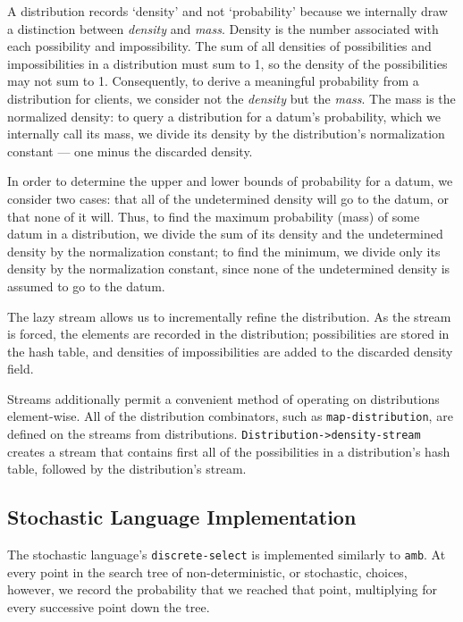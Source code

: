 \documentclass[12pt]{article}
\newcommand{\code}[1]{\texttt{#1}}
\newcommand{\concept}[1]{\textit{#1}}
\begin{document}
A distribution records `density' and not `probability' because we
 internally draw a distinction between \concept{density} and
 \concept{mass}.
Density is the number associated with each possibility and
 impossibility.
The sum of all densities of possibilities and impossibilities in a
 distribution must sum to 1, so the density of the possibilities may
 not sum to 1.
Consequently, to derive a meaningful probability from a distribution
 for clients, we consider not the \emph{density} but the \emph{mass}.
The mass is the normalized density: to query a distribution for a
 datum's probability, which we internally call its mass, we divide its
 density by the distribution's normalization constant --- one minus
 the discarded density.

In order to determine the upper and lower bounds of probability for a
 datum, we consider two cases: that all of the undetermined density
 will go to the datum, or that none of it will.
Thus, to find the maximum probability (mass) of some datum in a
 distribution, we divide the sum of its density and the undetermined
 density by the normalization constant; to find the minimum, we divide
 only its density by the normalization constant, since none of the
 undetermined density is assumed to go to the datum.

The lazy stream allows us to incrementally refine the distribution.
As the stream is forced, the elements are recorded in the
 distribution; possibilities are stored in the hash table, and
 densities of impossibilities are added to the discarded density
 field.

Streams additionally permit a convenient method of operating on
 distributions element-wise.
All of the distribution combinators, such as \code{map-distribution},
 are defined on the streams from distributions.
\code{Distribution->density-stream} creates a stream that contains
 first all of the possibilities in a distribution's hash table,
 followed by the distribution's stream.

\subsection{Stochastic Language Implementation}

The stochastic language's \code{discrete-select} is implemented
 similarly to \code{amb}.
At every point in the search tree of non-deterministic, or stochastic,
 choices, however, we record the probability that we reached that
 point, multiplying for every successive point down the tree.
\end{document}
